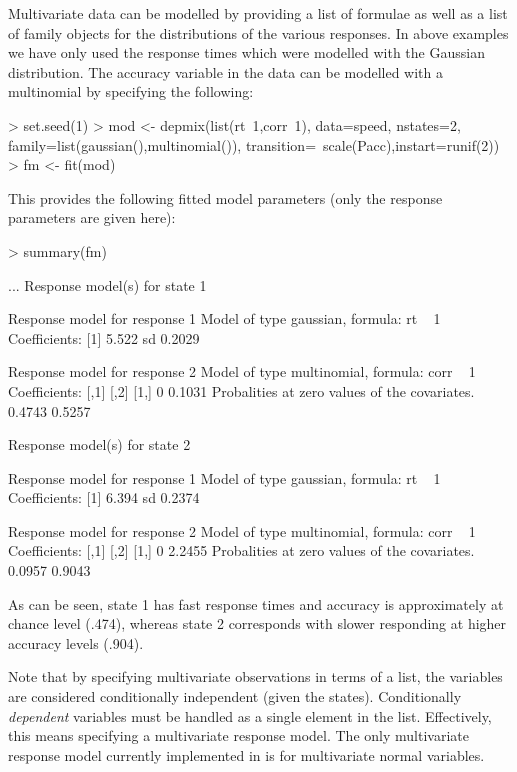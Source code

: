 \documentclass[article]{jss}
\begin{document}
Multivariate data can be modelled by providing a list of formulae as
well as a list of family objects for the distributions of the various
responses.  In above examples we have only used the response times
which were modelled with the Gaussian distribution.  The accuracy
variable in the  data can be modelled with a multinomial
by specifying the following:
\begin{CodeChunk}
\begin{CodeInput}
> set.seed(1)
> mod <- depmix(list(rt~1,corr~1), data=speed, nstates=2, 
    family=list(gaussian(),multinomial()),
    transition=~scale(Pacc),instart=runif(2))
> fm <- fit(mod)
\end{CodeInput}
\end{CodeChunk}
This provides the following fitted model parameters (only the 
response parameters are given here): 
\begin{CodeChunk}
\begin{CodeInput}
> summary(fm)
\end{CodeInput}
\begin{CodeOutput}
...
Response model(s) for state 1 

Response model for response 1 
Model of type gaussian, formula: rt ~ 1
Coefficients: 
[1] 5.522
sd  0.2029 

Response model for response 2 
Model of type multinomial, formula: corr ~ 1
Coefficients: 
     [,1]      [,2]
[1,]    0 0.1031
Probalities at zero values of the covariates.
0.4743 0.5257

Response model(s) for state 2 

Response model for response 1 
Model of type gaussian, formula: rt ~ 1
Coefficients: 
[1] 6.394
sd  0.2374

Response model for response 2 
Model of type multinomial, formula: corr ~ 1
Coefficients: 
	   [,1]     [,2]
[1,]    0 2.2455
Probalities at zero values of the covariates.
0.0957 0.9043 	
\end{CodeOutput}
\end{CodeChunk}
As can be seen, state 1 has fast response times and accuracy is
approximately at chance level (.474), whereas state 2 corresponds with
slower responding at higher accuracy levels (.904).

Note that by specifying multivariate observations in terms of a list,
the variables are considered conditionally independent (given the
states).  Conditionally \emph{dependent} variables must be handled as
a single element in the list.  Effectively, this means specifying a
multivariate response model.  The only multivariate response model
currently implemented in  is for multivariate normal
variables.
\end{document}
